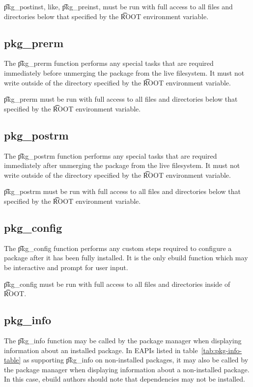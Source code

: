 \t{pkg_postinst}, like, \t{pkg_preinst}, must be run with full access to all files and directories
below that specified by the \t{ROOT} environment variable.

\subsection{pkg_prerm}

The \t{pkg_prerm} function performs any special tasks that are required immediately before
unmerging the package from the live filesystem. It must not write outside of the directory specified
by the \t{ROOT} environment variable.

\t{pkg_prerm} must be run with full access to all files and directories below that specified by
the \t{ROOT} environment variable.

\subsection{pkg_postrm}

The \t{pkg_postrm} function performs any special tasks that are required immediately after
unmerging the package from the live filesystem. It must not write outside of the directory specified
by the \t{ROOT} environment variable.

\t{pkg_postrm} must be run with full access to all files and directories below that specified by
the \t{ROOT} environment variable.

\subsection{pkg_config}

The \t{pkg_config} function performs any custom steps required to configure a package after it has been
fully installed. It is the only ebuild function which may be interactive and prompt for user input.

\t{pkg_config} must be run with full access to all files and directories inside of \t{ROOT}.

\subsection{pkg_info}

 The \t{pkg_info} function may be called by the package manager when
displaying information about an installed package. In EAPIs listed in table~\ref{tab:pkg-info-table}
as supporting \t{pkg_info} on non-installed packages, it may also be called by the package manager
when displaying information about a non-installed package. In this case, ebuild authors should note
that dependencies may not be installed.

